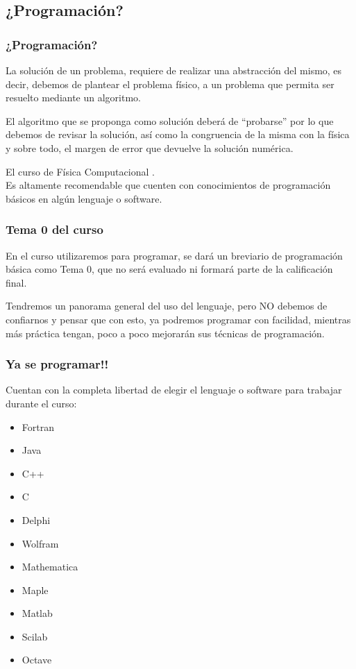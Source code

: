 \subsection{¿Programación?}
\begin{frame}
\frametitle{¿Programación?}
La solución de un problema, requiere de realizar una abstracción del mismo, es decir, debemos de plantear el problema físico, a un problema que permita ser resuelto mediante un algoritmo.
\end{frame}
\begin{frame}
El algoritmo que se proponga como solución deberá de \enquote{probarse} por lo que debemos de revisar la solución, así como la congruencia de la misma con la física y sobre todo, el margen de error que devuelve la solución numérica.
\end{frame}
\begin{frame}
El curso de Física Computacional .
\\
\bigskip
Es altamente recomendable que cuenten con conocimientos de programación básicos en algún lenguaje o software.
\end{frame}
\begin{frame}
\frametitle{Tema 0 del curso}
En el curso utilizaremos \textoazul{\python} para programar, se dará un breviario de programación básica como Tema 0, que no será evaluado ni formará parte de la calificación final.
\end{frame}
\begin{frame}
Tendremos un panorama general del uso del lenguaje, pero NO debemos de confiarnos y pensar que con esto, ya podremos programar con facilidad, mientras más práctica tengan, poco a poco mejorarán sus técnicas de programación.
\end{frame}
\begin{frame}
\frametitle{Ya se programar!!}
Cuentan con la completa libertad de elegir el lenguaje o software para trabajar durante el curso:
\begin{multicols}{2}
\begin{itemize}
\item Fortran
\item Java
\item C++
\item C
\item Delphi
\item Wolfram
\item Mathematica
\item Maple
\item Matlab
\item Scilab
\item Octave
\end{itemize}
\end{multicols}
\end{frame}
